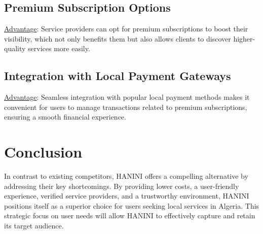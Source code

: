 \documentclass[12pt,a4paper]{report}
\begin{document}
\section{Premium Subscription Options}
\underline {Advantage}:  Service providers can opt for premium subscriptions to boost their visibility, which not only benefits them but also allows clients to discover higher-quality services more easily.

\section{Integration with Local Payment Gateways}
\underline {Advantage}:  Seamless integration with popular local payment methods makes it convenient for users to manage transactions related to premium subscriptions, ensuring a smooth financial experience.
\newpage
\chapter{Conclusion}
In contrast to existing competitors, HANINI offers a compelling alternative by addressing their key shortcomings. By providing lower costs, a user-friendly experience, verified service providers, and a trustworthy environment, HANINI positions itself as a superior choice for users seeking local services in Algeria. This strategic focus on user needs will allow HANINI to effectively capture and retain its target audience.
\end{document}
